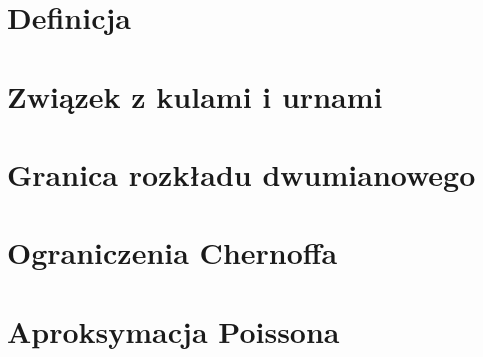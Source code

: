 \section{Definicja}


\newpage
\section{Związek z kulami i urnami}


\newpage
\section{Granica rozkładu dwumianowego}


\newpage
\section{Ograniczenia Chernoffa}


\newpage
\section{Aproksymacja Poissona}


